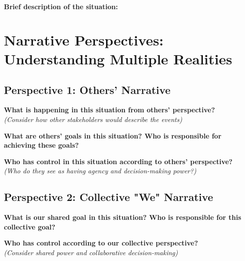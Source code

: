 \documentclass[11pt,a4paper]{article}
\begin{document}
\noindent\textbf{Brief description of the situation:}
\begin{answerbox}
\vspace{3em}
\end{answerbox}

\section{Narrative Perspectives: Understanding Multiple Realities}

\subsection{Perspective 1: Others' Narrative}

\noindent\textbf{What is happening in this situation from others' perspective?}\\
\textit{(Consider how other stakeholders would describe the events)}
\begin{answerbox}
\vspace{3em}
\end{answerbox}

\noindent\textbf{What are others' goals in this situation? Who is responsible for achieving these goals?}
\begin{answerbox}
\vspace{3em}
\end{answerbox}

\noindent\textbf{Who has control in this situation according to others' perspective?}\\
\textit{(Who do they see as having agency and decision-making power?)}
\begin{answerbox}
\vspace{3em}
\end{answerbox}

\subsection{Perspective 2: Collective "We" Narrative}

\noindent\textbf{What is our shared goal in this situation? Who is responsible for this collective goal?}
\begin{answerbox}
\vspace{3em}
\end{answerbox}

\noindent\textbf{Who has control according to our collective perspective?}\\
\textit{(Consider shared power and collaborative decision-making)}
\begin{answerbox}
\vspace{3em}
\end{answerbox}
\end{document}
